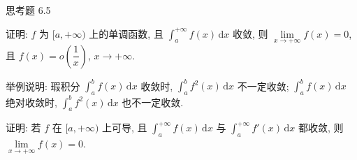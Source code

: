 \begin{exblock}{思考题 6.5}
  \item 证明: $f$ 为 $[a,+\infty)$ 上的单调函数, 且 $\int_{a}^{+\infty}f(x)\,\mathrm{d}x$ 收敛, 则 $\lim\limits_{x\to+\infty}f(x)=0$, 且 $f(x)=o\left(\dfrac{1}{x}\right)$, $x\to+\infty$.

  \item 举例说明: 瑕积分 $\int_{a}^{b}f(x)\,\mathrm{d}x$ 收敛时, $\int_{a}^{b}f^{2}(x)\,\mathrm{d}x$ 不一定收敛; $\int_{a}^{b}f(x)\,\mathrm{d}x$ 绝对收敛时, $\int_{a}^{b}f^{2}(x)\,\mathrm{d}x$ 也不一定收敛.

  \item 证明: 若 $f$ 在 $[a,+\infty)$ 上可导, 且 $\int_{a}^{+\infty}f(x)\,\mathrm{d}x$ 与 $\int_{a}^{+\infty}f'(x)\,\mathrm{d}x$ 都收敛, 则 $\lim\limits_{x\to+\infty}f(x)=0$.

\end{exblock}
